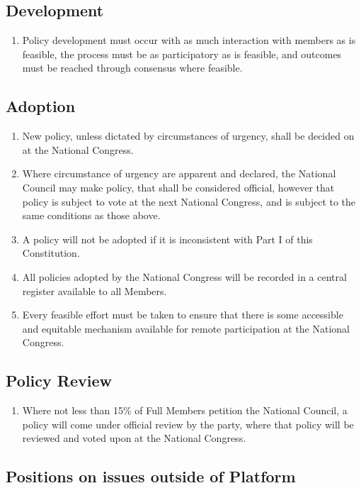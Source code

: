 \documentclass[a4paper,titlepage,8.5pt]{article}
\begin{document}
\subsection{Development}

\begin{enumerate}
\item Policy development must occur with as much interaction with members as is feasible, the process must be as participatory as is feasible, and outcomes must be reached through consensus where feasible.
\end{enumerate}

\subsection{Adoption}

\begin{enumerate}
\item New policy, unless dictated by circumstances of urgency, shall be decided on at the National Congress.
\item Where circumstance of urgency are apparent and declared, the National Council may make policy, that shall be considered official, however that policy is subject to vote at the next National Congress, and is subject to the same conditions as those above.
\item A policy will not be adopted if it is inconsistent with Part I of this Constitution.
\item All policies adopted by the National Congress will be recorded in a central register available to all Members.
\item Every feasible effort must be taken to ensure that there is some accessible and equitable mechanism available for remote participation at the National Congress.
\end{enumerate}

\subsection{Policy Review}

\begin{enumerate}
\item Where not less than 15\% of Full Members petition the National Council, a policy will come under official review by the party, where that policy will be reviewed and voted upon at the National Congress.
\end{enumerate}

\subsection{Positions on issues outside of Platform}
\end{document}
